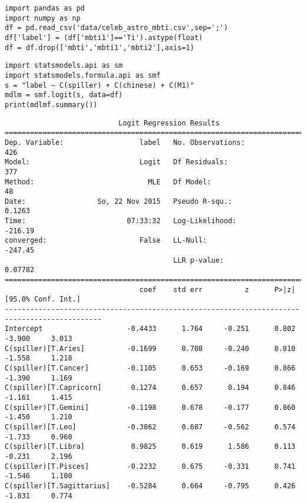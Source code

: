 \documentclass[12pt,fleqn]{article}\usepackage{../common}
\begin{document}
\begin{verbatim}
import pandas as pd
import numpy as np
df = pd.read_csv('data/celeb_astro_mbti.csv',sep=';')
df['label'] = (df['mbti1']=='Ti').astype(float)
df = df.drop(['mbti','mbti1','mbti2'],axis=1)
\end{verbatim}

\begin{verbatim}
import statsmodels.api as sm
import statsmodels.formula.api as smf
s = "label ~ C(spiller) + C(chinese) + C(M1)"
mdlm = smf.logit(s, data=df)
print(mdlmf.summary())
\end{verbatim}

\begin{verbatim}
                           Logit Regression Results                           
==============================================================================
Dep. Variable:                  label   No. Observations:                  426
Model:                          Logit   Df Residuals:                      377
Method:                           MLE   Df Model:                           48
Date:                 So, 22 Nov 2015   Pseudo R-squ.:                  0.1263
Time:                        07:33:32   Log-Likelihood:                -216.19
converged:                      False   LL-Null:                       -247.45
                                        LLR p-value:                   0.07782
=============================================================================================
                                coef    std err          z      P>|z|      [95.0% Conf. Int.]
---------------------------------------------------------------------------------------------
Intercept                    -0.4433      1.764     -0.251      0.802        -3.900     3.013
C(spiller)[T.Aries]          -0.1699      0.708     -0.240      0.810        -1.558     1.218
C(spiller)[T.Cancer]         -0.1105      0.653     -0.169      0.866        -1.390     1.169
C(spiller)[T.Capricorn]       0.1274      0.657      0.194      0.846        -1.161     1.415
C(spiller)[T.Gemini]         -0.1198      0.678     -0.177      0.860        -1.450     1.210
C(spiller)[T.Leo]            -0.3862      0.687     -0.562      0.574        -1.733     0.960
C(spiller)[T.Libra]           0.9825      0.619      1.586      0.113        -0.231     2.196
C(spiller)[T.Pisces]         -0.2232      0.675     -0.331      0.741        -1.546     1.100
C(spiller)[T.Sagittarius]    -0.5284      0.664     -0.795      0.426        -1.831     0.774

\end{verbatim}
\end{document}
